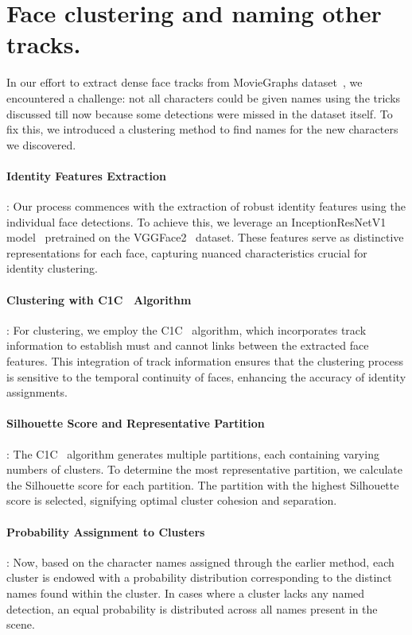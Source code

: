 \section{Face clustering and naming other tracks.}
\label{sec:face_clustering}
In our effort to extract dense face tracks from MovieGraphs dataset~\cite{moviegraphs}, we encountered a challenge: not all characters could be given names using the tricks discussed till now because some detections were missed in the dataset itself. To fix this, we introduced a clustering method to find names for the new characters we discovered.

\paragraph{Identity Features Extraction}:
Our process commences with the extraction of robust identity features using the individual face detections. To achieve this, we leverage an InceptionResNetV1 model~\cite{SzegedyInceptionNet2015} pretrained on the VGGFace2~\cite{CaoVGGF22018} dataset. These features serve as distinctive representations for each face, capturing nuanced characteristics crucial for identity clustering.

\paragraph{Clustering with C1C~\cite{c1c} Algorithm}:
For clustering, we employ the C1C~\cite{c1c} algorithm, which incorporates track information to establish must and cannot links between the extracted face features. This integration of track information ensures that the clustering process is sensitive to the temporal continuity of faces, enhancing the accuracy of identity assignments.

\paragraph{Silhouette Score and Representative Partition}:
The C1C~\cite{c1c} algorithm generates multiple partitions, each containing varying numbers of clusters. To determine the most representative partition, we calculate the Silhouette score for each partition. The partition with the highest Silhouette score is selected, signifying optimal cluster cohesion and separation.

\paragraph{Probability Assignment to Clusters}:
Now, based on the character names assigned through the earlier method, each cluster is endowed with a probability distribution corresponding to the distinct names found within the cluster. In cases where a cluster lacks any named detection, an equal probability is distributed across all names present in the scene.

